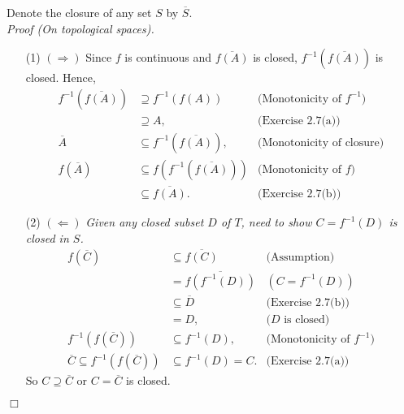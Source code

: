 \documentclass{article}
\begin{document}
Denote the closure of any set $S$ by $\overline{S}$. \\

\emph{Proof (On topological spaces).}
\begin{enumerate}
\item[(1)]
$(\Longrightarrow)$
Since $f$ is continuous and $\overline{f(A)}$ is closed,
$f^{-1}(\overline{f(A)})$ is closed.
Hence,
\begin{align*}
f^{-1}(\overline{f(A)})
&\supseteq f^{-1}(f(A))
  & \text{(Monotonicity of $f^{-1}$)} \\
&\supseteq A,
  & \text{(Exercise 2.7(a))} \\
\overline{A}
&\subseteq f^{-1}(\overline{f(A)}),
  & \text{(Monotonicity of closure)} \\
f(\overline{A})
&\subseteq f(f^{-1}(\overline{f(A)}))
  & \text{(Monotonicity of $f$)} \\
&\subseteq \overline{f(A)}.
  & \text{(Exercise 2.7(b))}
\end{align*}
\item[(2)]
$(\Longleftarrow)$
\emph{Given any closed subset $D$ of $T$, need to show
$C = f^{-1}(D)$ is closed in $S$.}
\begin{align*}
f(\overline{C})
&\subseteq \overline{f(C)}
  &\text{(Assumption)} \\
&= \overline{f(f^{-1}(D))}
  &(C = f^{-1}(D))\\
&\subseteq \overline{D}
  &\text{(Exercise 2.7(b))} \\
&= D,
  &\text{($D$ is closed)} \\
f^{-1}(f(\overline{C}))
&\subseteq f^{-1}(D),
  &\text{(Monotonicity of $f^{-1}$)} \\
\overline{C} \subseteq f^{-1}(f(\overline{C}))
&\subseteq f^{-1}(D) = C.
  &\text{(Exercise 2.7(a))}
\end{align*}
So $C \supseteq \overline{C}$ or $C = \overline{C}$ is closed.
\end{enumerate}
$\Box$ \\
\end{document}
